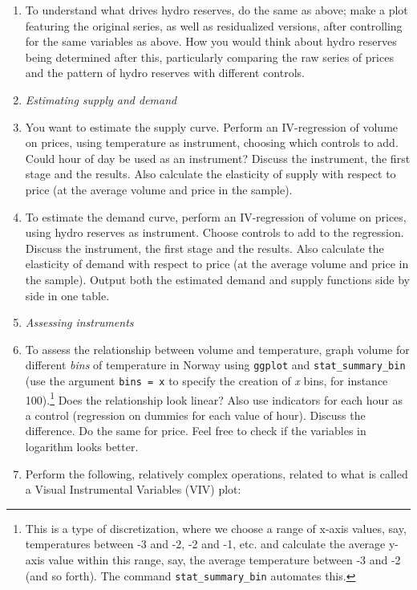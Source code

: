 \documentclass[12pt,a4paper]{article}
\begin{document}
\begin{enumerate}
\item To understand what drives hydro reserves, do the same as above; make a plot featuring the original series, as well as residualized versions, after controlling for the same variables as above. How you would think about hydro reserves being determined after this, particularly comparing the raw series of prices and the pattern of hydro reserves with different controls.
\item[] \emph{Estimating supply and demand}
\item You want to estimate the supply curve. Perform an IV-regression of volume on prices, using temperature as instrument, choosing which controls to add. Could hour of day be used as an instrument? Discuss the instrument, the first stage and the results. Also calculate the elasticity of supply with respect to price (at the average volume and price in the sample).
\item To estimate the demand curve, perform an IV-regression of volume on prices, using hydro reserves as instrument. Choose controls to add to the regression. Discuss the instrument, the first stage and the results. Also calculate the elasticity of demand with respect to price (at the average volume and price in the sample). Output both the estimated demand and supply functions side by side in one table.
\item[] \emph{Assessing instruments}
\item To assess the relationship between volume and temperature, graph volume for different \emph{bins} of temperature in Norway using \texttt{ggplot} and \texttt{stat\_summary\_bin} (use the argument \texttt{bins = x} to specify the creation of \emph{x} bins, for instance 100).\footnote{This is a type of discretization, where we choose a range of x-axis values, say, temperatures between -3 and -2, -2 and -1, etc. and calculate the average y-axis value within this range, say, the average temperature between -3 and -2 (and so forth). The command \texttt{stat\_summary\_bin} automates this.} Does the relationship look linear? Also use indicators for each hour as a control (regression on dummies for each value of hour). Discuss the difference. Do the same for price. Feel free to check if the variables in logarithm looks better.
\item Perform the following, relatively complex operations, related to what is called a Visual Instrumental Variables (VIV) plot:
\begin{enumerate}

\end{enumerate}
\end{enumerate}
\end{document}
